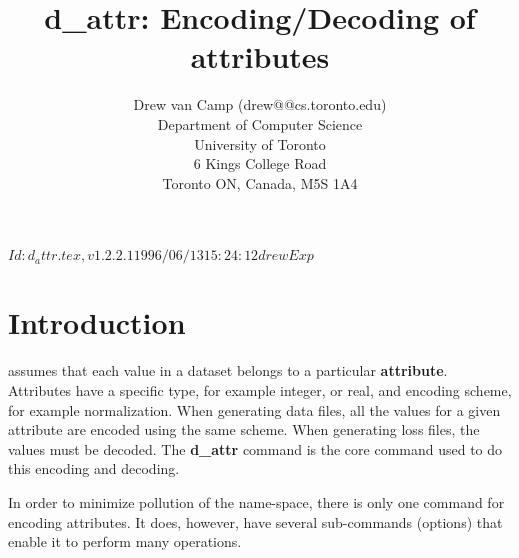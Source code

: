 \documentclass{article}
\newcommand{\dattr}{\textbf{d\_attr}}
\begin{document}
\rcsInfo $Id: d_attr.tex,v 1.2.2.1 1996/06/13 15:24:12 drew Exp $

\title{d\_attr: Encoding/Decoding of attributes}
\author{Drew van Camp (drew@@cs.toronto.edu)\\[1ex]
	Department of Computer Science\\
	University of Toronto\\
	6 Kings College Road\\
	Toronto ON, Canada, M5S 1A4}

\vfil
\maketitle
\vfil
{}
\vfil
\clearpage

\section{Introduction}

\delve{} assumes that each value in a dataset belongs to a particular
\textbf{attribute}.  Attributes have a specific type, for example
integer, or real, and encoding scheme, for example normalization.  When
generating data files, all the values for a given attribute are encoded
using the same scheme.  When generating loss files, the values must be
decoded.  The \dattr{} command is the core command used to do this
encoding and decoding.

In order to minimize pollution of the name-space, there is only one
command for encoding attributes. It does, however, have several
sub-commands (options) that enable it to perform many operations.
\end{document}

